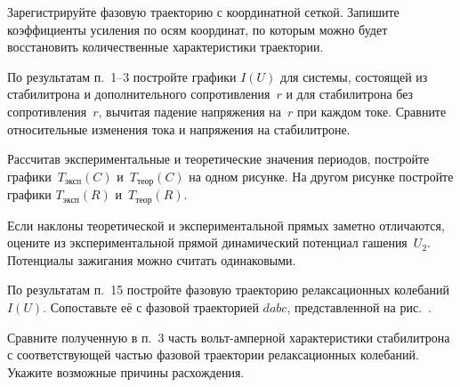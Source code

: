 \begin{lab:task}
        \item Зарегистрируйте фазовую траекторию с координатной сеткой.
        Запишите коэффициенты усиления по осям координат, по которым
        можно будет восстановить количественные характеристики траектории.


		\item По результатам п.~1--3 постройте графики $I(U)$ для системы,
        состоящей из стабилитрона и дополнительного сопротивления~$r$ и для
        стабилитрона без сопротивления~$r$, вычитая падение напряжения
        на~$r$ при каждом токе. Сравните относительные изменения тока и 
        напряжения на стабилитроне.
        
        \item Рассчитав экспериментальные и теоретические значения периодов,
        постройте графики~$T_{\text{эксп}}(C)$ и~$T_{\text{теор}}(C)$ на
        одном рисунке. На другом рисунке постройте графики 
        $T_{\text{эксп}}(R)$ и~$T_{\text{теор}}(R)$.

		\item Если наклоны теоретической и экспериментальной прямых заметно
        отличаются, оцените из экспериментальной прямой динамический потенциал 
        гашения~$U_2$. Потенциалы зажигания можно считать одинаковыми.
        
        \item По результатам п.~15 постройте фазовую траекторию релаксационных
        колебаний $I(U)$. Сопоставьте её с фазовой траекторией $dabc$,
        представленной на рис.~.
        
        \item Сравните полученную в п.~3 часть вольт-амперной характеристики
        стабилитрона с соответствующей частью фазовой траектории
        релаксационных колебаний. Укажите возможные причины расхождения.
        
\end{lab:task}


